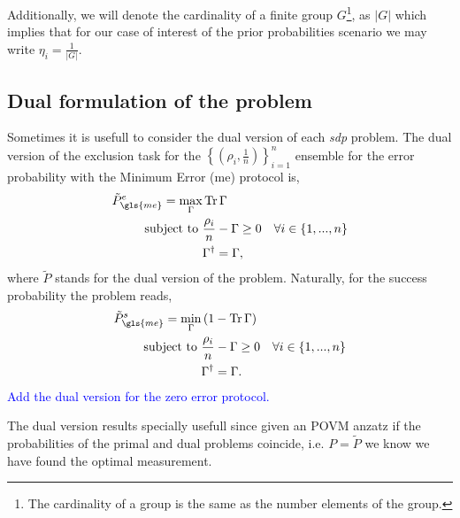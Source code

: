 \documentclass[12pt,letterpaper]{article}
\DeclareMathOperator{\tr}{Tr}
\begin{document}
\begin{multicols}{2}
Additionally, we will denote the cardinality of a finite group $G$\footnote{The cardinality of a group is the same as the number elements of the group.}, as $|G|$ which implies that for our case of interest of the prior probabilities scenario we may write $\eta_i=\frac{1}{|G|}$.

\subsection{Dual formulation of the problem}
Sometimes it is usefull to consider the dual version of each \emph{sdp} problem. The dual version of the exclusion task for the $\left\{\left(\rho_i,\frac{1}{n}\right)\right\}_{i=1}^n$ ensemble for the error probability with the Minimum Error (\gls{me}) protocol is,
\begin{align*}
	\tilde{P}_{\gls{me}}^e=\max_{\Gamma}&\tr{\Gamma}\\
	\text{subject to }&\frac{\rho_i}{n}-\Gamma\geq 0\quad\forall i\in\{1,...,n\}\\
	&\Gamma^\dagger=\Gamma,
\end{align*}
where $\tilde{P}$ stands for the dual version of the problem. Naturally, for the success probability the problem reads,
\begin{align*}
	\tilde{P}_{\gls{me}}^s=\min_{\Gamma}&\left(1-\tr{\Gamma}\right)\\
	\text{subject to }&\frac{\rho_i}{n}-\Gamma\geq 0\quad\forall i\in\{1,...,n\}\\
	&\Gamma^\dagger=\Gamma.
\end{align*}
\textcolor{blue}{Add the dual version for the zero error protocol.}

The dual version results specially usefull since given an POVM anzatz if the probabilities of the primal and dual problems coincide, i.e. $P=\tilde P$ we know we have found the optimal measurement. 


\end{multicols}
\end{document}
